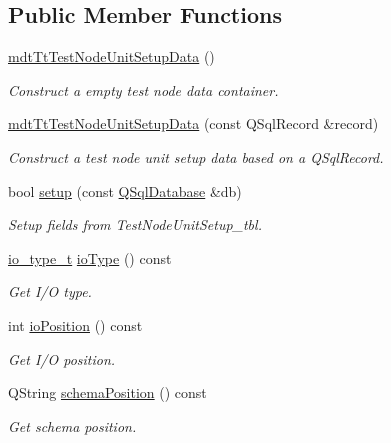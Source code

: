 \subsection*{Public Member Functions}
\begin{DoxyCompactItemize}
\item 
\hyperlink{classmdt_tt_test_node_unit_setup_data_a0d9372606909ab76e423f8aa180a9c38}{mdt\-Tt\-Test\-Node\-Unit\-Setup\-Data} ()
\begin{DoxyCompactList}\small\item\em Construct a empty test node data container. \end{DoxyCompactList}\item 
\hyperlink{classmdt_tt_test_node_unit_setup_data_aee5b9ec83805c0ef6fecae14adcee518}{mdt\-Tt\-Test\-Node\-Unit\-Setup\-Data} (const Q\-Sql\-Record \&record)
\begin{DoxyCompactList}\small\item\em Construct a test node unit setup data based on a Q\-Sql\-Record. \end{DoxyCompactList}\item 
bool \hyperlink{classmdt_tt_test_node_unit_setup_data_a2a2bb93f0ceb79adec8b4692cf1afb39}{setup} (const \hyperlink{class_q_sql_database}{Q\-Sql\-Database} \&db)
\begin{DoxyCompactList}\small\item\em Setup fields from Test\-Node\-Unit\-Setup\-\_\-tbl. \end{DoxyCompactList}\item 
\hyperlink{classmdt_tt_test_node_unit_setup_data_a4e69dcc72bebc34d6db64cff91dbfc54}{io\-\_\-type\-\_\-t} \hyperlink{classmdt_tt_test_node_unit_setup_data_a9fd9a35361e52d466ef6e62d29383aa4}{io\-Type} () const 
\begin{DoxyCompactList}\small\item\em Get I/\-O type. \end{DoxyCompactList}\item 
int \hyperlink{classmdt_tt_test_node_unit_setup_data_a24b6ba073f10005678ada247d2b23791}{io\-Position} () const 
\begin{DoxyCompactList}\small\item\em Get I/\-O position. \end{DoxyCompactList}\item 
Q\-String \hyperlink{classmdt_tt_test_node_unit_setup_data_a6ef0406acc3ef7b0b2ee8f168d2a3c76}{schema\-Position} () const 
\begin{DoxyCompactList}\small\item\em Get schema position. \end{DoxyCompactList}\end{DoxyCompactItemize}
